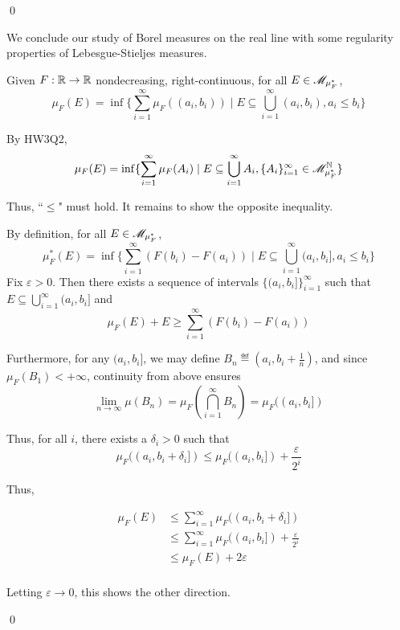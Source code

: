 \documentclass[x11names,reqno,14pt]{extarticle}
\newcommand*{\oo}{\infty}
\newcommand{\seq}[1]{_{#1 = 1}^\oo}
\begin{document}
\qed

We conclude our study of Borel measures on the real line with some regularity properties of Lebesgue-Stieljes measures. 

\lem

Given $F:\mathbb{R}\to\mathbb{R}$ nondecreasing, right-continuous, for all $E \in \mathscr{M}_{\mu^*_F}$, 
\[
\mu_F(E) = \inf\{\sum\seq{i}\mu_F((a_i, b_i)) \mid E\subseteq\bigcup\seq{i}(a_i, b_i), a_i \leq b_i \}
\]

\proof

By HW3Q2, 
\[
\mu_F(E) = \inf\{\sum\seq{i}\mu_F(A_i) \mid E \subseteq\bigcup\seq{i} A_i, \{A_i\}\seq{i} \in \ms{M}_{\mu^*_F}^\N\}
\]

Thus, ``$\leq$" must hold. It remains to show the opposite inequality. 

By definition, for all $E \in \mathscr{M}_{\mu^*_F}$, 
\[
\mu^*_F(E) = \inf\{\sum\seq{i}(F(b_i) - F(a_i)) \mid E \subseteq \bigcup\seq{i}(a_i, b_i], a_i \leq b_i\}
\]
Fix $\varepsilon>0$. Then there exists a sequence of intervals $\{(a_i, b_i]\}\seq{i}$ such that $E\subseteq\bigcup\seq{i}(a_i, b_i]$ and 
\[
\mu_F(E) + E \geq \sum\seq{i}(F(b_i) - F(a_i)) 
\]

Furthermore, for any $(a_i, b_i]$, we may define $B_n\eqdef (a_i, b_i + \frac{1}{n})$, and since $\mu_F(B_1)<+\oo$, continuity from above ensures
\[
\lim_{n\to\oo}\mu(B_n)=\mu_F\left(\bigcap\seq{i}B_n\right) = \mu_F((a_i, b_i])
\]

Thus, for all $i$, there exists a $\delta_i>0$ such that 
\[
\mu_F((a_i, b_i + \delta_i]) \leq \mu_F((a_i, b_i]) + \frac{\varepsilon}{2^i}
\]

Thus, 

\begin{align*}
\mu_F(E) & \leq \sum\seq{i}\mu_F((a_i, b_i + \delta_i]) \\
			& \leq \sum\seq{i}\mu_F((a_i, b_i]) + \frac{\varepsilon}{2^i} \\
			& \leq \mu_F(E) + 2\varepsilon\\
\end{align*}

Letting $\varepsilon\to0$, this shows the other direction. 

\qed
\end{document}
